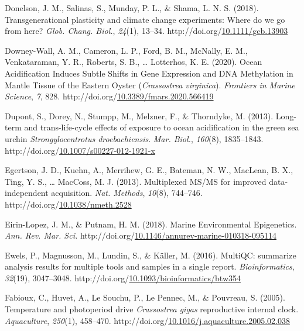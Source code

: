 \documentclass [11pt, proquest] {uwthesis}[2015/03/03]
\newlength{\cslhangindent}
\newenvironment{CSLReferences}%
{\setlength{\parindent}{0pt}%
\everypar{\setlength{\hangindent}{\cslhangindent}}\ignorespaces}%
{\par}
\begin{document}
\begin{CSLReferences}{1}{0}
\leavevmode\hypertarget{ref-Donelson2018}{}%
Donelson, J. M., Salinas, S., Munday, P. L., \& Shama, L. N. S. (2018). {Transgenerational plasticity and climate change experiments: Where do we go from here?} \emph{Glob. Chang. Biol.}, \emph{24}(1), 13--34. http://doi.org/\href{https://doi.org/10.1111/gcb.13903}{10.1111/gcb.13903}

\leavevmode\hypertarget{ref-Downey-Wall2020}{}%
Downey-Wall, A. M., Cameron, L. P., Ford, B. M., McNally, E. M., Venkataraman, Y. R., Roberts, S. B., \ldots{} Lotterhos, K. E. (2020). {Ocean Acidification Induces Subtle Shifts in Gene Expression and DNA Methylation in Mantle Tissue of the Eastern Oyster (\emph{Crassostrea virginica})}. \emph{Frontiers in Marine Science}, \emph{7}, 828. http://doi.org/\href{https://doi.org/10.3389/fmars.2020.566419}{10.3389/fmars.2020.566419}

\leavevmode\hypertarget{ref-Dupont2013}{}%
Dupont, S., Dorey, N., Stumpp, M., Melzner, F., \& Thorndyke, M. (2013). {Long-term and trans-life-cycle effects of exposure to ocean acidification in the green sea urchin \emph{Strongylocentrotus droebachiensis}}. \emph{Mar. Biol.}, \emph{160}(8), 1835--1843. http://doi.org/\href{https://doi.org/10.1007/s00227-012-1921-x}{10.1007/s00227-012-1921-x}

\leavevmode\hypertarget{ref-Egertson2013}{}%
Egertson, J. D., Kuehn, A., Merrihew, G. E., Bateman, N. W., MacLean, B. X., Ting, Y. S., \ldots{} MacCoss, M. J. (2013). {Multiplexed MS/MS for improved data-independent acquisition}. \emph{Nat. Methods}, \emph{10}(8), 744--746. http://doi.org/\href{https://doi.org/10.1038/nmeth.2528}{10.1038/nmeth.2528}

\leavevmode\hypertarget{ref-Eirin-Lopez2018}{}%
Eirin-Lopez, J. M., \& Putnam, H. M. (2018). {Marine Environmental Epigenetics}. \emph{Ann. Rev. Mar. Sci.} http://doi.org/\href{https://doi.org/10.1146/annurev-marine-010318-095114}{10.1146/annurev-marine-010318-095114}

\leavevmode\hypertarget{ref-Ewels2016}{}%
Ewels, P., Magnusson, M., Lundin, S., \& Käller, M. (2016). {MultiQC: summarize analysis results for multiple tools and samples in a single report}. \emph{Bioinformatics}, \emph{32}(19), 3047--3048. http://doi.org/\href{https://doi.org/10.1093/bioinformatics/btw354}{10.1093/bioinformatics/btw354}

\leavevmode\hypertarget{ref-Fabioux2005}{}%
Fabioux, C., Huvet, A., Le Souchu, P., Le Pennec, M., \& Pouvreau, S. (2005). {Temperature and photoperiod drive \emph{Crassostrea gigas} reproductive internal clock}. \emph{Aquaculture}, \emph{250}(1), 458--470. http://doi.org/\href{https://doi.org/10.1016/j.aquaculture.2005.02.038}{10.1016/j.aquaculture.2005.02.038}


\end{CSLReferences}
\end{document}
